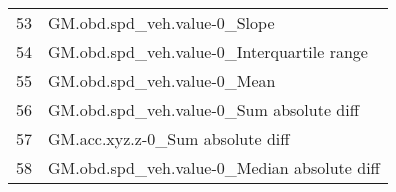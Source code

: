 \begin{tabular}{ll}
53 &                      GM.obd.spd\_veh.value-0\_Slope \\
54 &        GM.obd.spd\_veh.value-0\_Interquartile range \\
55 &                       GM.obd.spd\_veh.value-0\_Mean \\
56 &          GM.obd.spd\_veh.value-0\_Sum absolute diff \\
57 &                  GM.acc.xyz.z-0\_Sum absolute diff \\
58 &       GM.obd.spd\_veh.value-0\_Median absolute diff \\
\bottomrule
\end{tabular}

